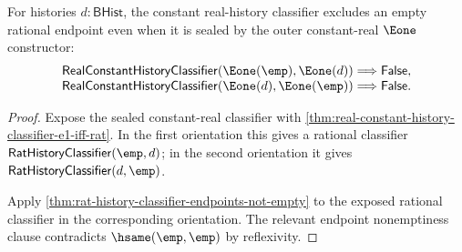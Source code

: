 \begin{theorem}
\label{thm:real-constant-history-classifier-e1-empty-endpoint-absurd}
For histories $d:\mathsf{BHist}$, the constant real-history classifier excludes
an empty rational endpoint even when it is sealed by the outer constant-real
$\Eone$ constructor:
$$
\begin{array}{l}
\mathsf{RealConstantHistoryClassifier}(\Eone(\emp),\Eone(d))
\Longrightarrow\mathsf{False},\\
\mathsf{RealConstantHistoryClassifier}(\Eone(d),\Eone(\emp))
\Longrightarrow\mathsf{False}.
\end{array}
$$
\end{theorem}
\begin{proof}
Expose the sealed constant-real classifier with
\autoref{thm:real-constant-history-classifier-e1-iff-rat}. In the first
orientation this gives a rational classifier
$\mathsf{RatHistoryClassifier}(\emp,d)$; in the second orientation it gives
$\mathsf{RatHistoryClassifier}(d,\emp)$.

Apply \autoref{thm:rat-history-classifier-endpoints-not-empty} to the exposed
rational classifier in the corresponding orientation. The relevant endpoint
nonemptiness clause contradicts $\hsame(\emp,\emp)$ by reflexivity.
\end{proof}

